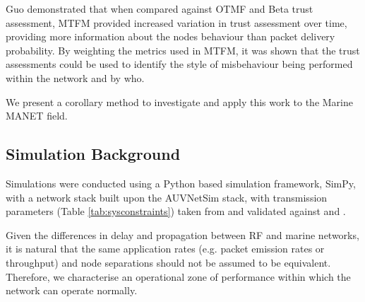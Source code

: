 \documentclass[runningheads,a4paper]{llncs}
\begin{document}
Guo demonstrated that when compared against OTMF and Beta trust assessment, MTFM provided increased variation in trust assessment over time, providing more information about the nodes behaviour than packet delivery probability. 
By weighting the metrics used in MTFM, it was shown that the trust assessments could be used to identify the style of misbehaviour being performed within the network and by who.

We present a corollary method to investigate and apply this work to the Marine MANET field.

\subsection{Simulation Background}

Simulations were conducted using a Python based simulation framework, SimPy\cite{Mueller2003SimPy}, with a network stack built upon the AUVNetSim stack\cite{Miquel2008}, with transmission parameters (Table \ref{tab:sysconstraints}) taken from and validated against \cite{Stojanovic2007} and \cite{Stefanov2011}.

Given the differences in delay and propagation between RF and marine networks, it is natural that the same application rates (e.g. packet emission rates or throughput) and node separations should not be assumed to be equivalent.
Therefore, we characterise an operational zone of performance within which the network can operate normally.
\end{document}
